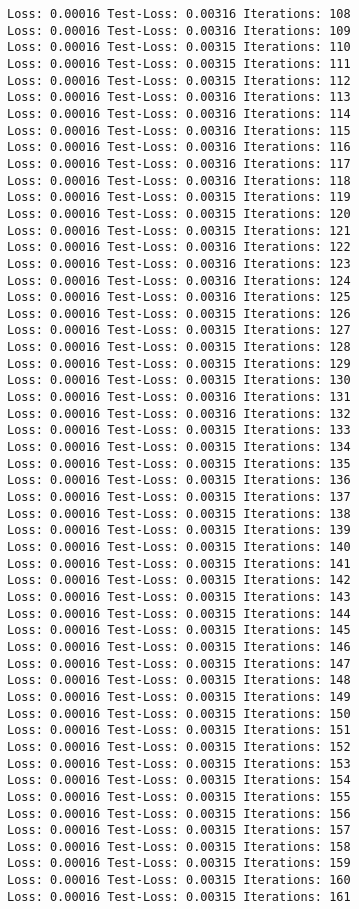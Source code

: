 \documentclass[11pt]{article}
\begin{document}
\begin{Verbatim}[commandchars=\\\{\}]
Loss: 0.00016 Test-Loss: 0.00316 Iterations: 108
Loss: 0.00016 Test-Loss: 0.00316 Iterations: 109
Loss: 0.00016 Test-Loss: 0.00315 Iterations: 110
Loss: 0.00016 Test-Loss: 0.00315 Iterations: 111
Loss: 0.00016 Test-Loss: 0.00315 Iterations: 112
Loss: 0.00016 Test-Loss: 0.00316 Iterations: 113
Loss: 0.00016 Test-Loss: 0.00316 Iterations: 114
Loss: 0.00016 Test-Loss: 0.00316 Iterations: 115
Loss: 0.00016 Test-Loss: 0.00316 Iterations: 116
Loss: 0.00016 Test-Loss: 0.00316 Iterations: 117
Loss: 0.00016 Test-Loss: 0.00316 Iterations: 118
Loss: 0.00016 Test-Loss: 0.00315 Iterations: 119
Loss: 0.00016 Test-Loss: 0.00315 Iterations: 120
Loss: 0.00016 Test-Loss: 0.00315 Iterations: 121
Loss: 0.00016 Test-Loss: 0.00316 Iterations: 122
Loss: 0.00016 Test-Loss: 0.00316 Iterations: 123
Loss: 0.00016 Test-Loss: 0.00316 Iterations: 124
Loss: 0.00016 Test-Loss: 0.00316 Iterations: 125
Loss: 0.00016 Test-Loss: 0.00315 Iterations: 126
Loss: 0.00016 Test-Loss: 0.00315 Iterations: 127
Loss: 0.00016 Test-Loss: 0.00315 Iterations: 128
Loss: 0.00016 Test-Loss: 0.00315 Iterations: 129
Loss: 0.00016 Test-Loss: 0.00315 Iterations: 130
Loss: 0.00016 Test-Loss: 0.00316 Iterations: 131
Loss: 0.00016 Test-Loss: 0.00316 Iterations: 132
Loss: 0.00016 Test-Loss: 0.00315 Iterations: 133
Loss: 0.00016 Test-Loss: 0.00315 Iterations: 134
Loss: 0.00016 Test-Loss: 0.00315 Iterations: 135
Loss: 0.00016 Test-Loss: 0.00315 Iterations: 136
Loss: 0.00016 Test-Loss: 0.00315 Iterations: 137
Loss: 0.00016 Test-Loss: 0.00315 Iterations: 138
Loss: 0.00016 Test-Loss: 0.00315 Iterations: 139
Loss: 0.00016 Test-Loss: 0.00315 Iterations: 140
Loss: 0.00016 Test-Loss: 0.00315 Iterations: 141
Loss: 0.00016 Test-Loss: 0.00315 Iterations: 142
Loss: 0.00016 Test-Loss: 0.00315 Iterations: 143
Loss: 0.00016 Test-Loss: 0.00315 Iterations: 144
Loss: 0.00016 Test-Loss: 0.00315 Iterations: 145
Loss: 0.00016 Test-Loss: 0.00315 Iterations: 146
Loss: 0.00016 Test-Loss: 0.00315 Iterations: 147
Loss: 0.00016 Test-Loss: 0.00315 Iterations: 148
Loss: 0.00016 Test-Loss: 0.00315 Iterations: 149
Loss: 0.00016 Test-Loss: 0.00315 Iterations: 150
Loss: 0.00016 Test-Loss: 0.00315 Iterations: 151
Loss: 0.00016 Test-Loss: 0.00315 Iterations: 152
Loss: 0.00016 Test-Loss: 0.00315 Iterations: 153
Loss: 0.00016 Test-Loss: 0.00315 Iterations: 154
Loss: 0.00016 Test-Loss: 0.00315 Iterations: 155
Loss: 0.00016 Test-Loss: 0.00315 Iterations: 156
Loss: 0.00016 Test-Loss: 0.00315 Iterations: 157
Loss: 0.00016 Test-Loss: 0.00315 Iterations: 158
Loss: 0.00016 Test-Loss: 0.00315 Iterations: 159
Loss: 0.00016 Test-Loss: 0.00315 Iterations: 160
Loss: 0.00016 Test-Loss: 0.00315 Iterations: 161

\end{Verbatim}
\end{document}
